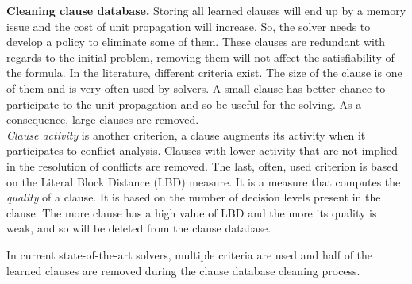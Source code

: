 \textbf{Cleaning clause database.}
Storing  all learned clauses will end up by a memory issue and the cost of unit propagation will increase.
 So, the solver needs to develop a policy to eliminate some of them. These clauses are redundant with regards to the initial 
 problem, removing them will not affect the satisfiability of the formula.
  In the literature, different criteria exist.
 The size of the clause is one of them and is very often used by solvers. 
 A small clause has better chance to participate to the unit propagation and so be useful for the solving.
 As a consequence, large clauses are removed.\\
\emph{Clause activity} is another criterion, a clause augments its activity when it participates to conflict analysis. 
Clauses with lower activity that are not implied in the resolution of conflicts are removed.
 The last, often, used criterion is based on the Literal Block Distance (LBD) measure. It is a measure that computes the \emph{quality} of a clause.
It is based on the number of decision levels present in the clause. The more clause has a high value of LBD and the more its quality is weak, 
and so will be deleted from the clause database.
 
In current state-of-the-art solvers, multiple criteria are used and half of the learned clauses are removed during the clause database cleaning process.

